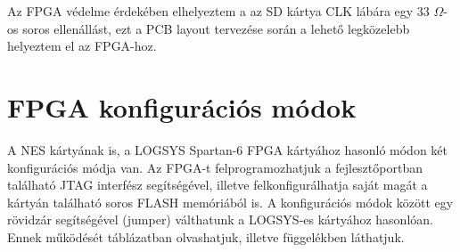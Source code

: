 	Az FPGA védelme érdekében elhelyeztem a az SD kártya CLK lábára egy 33 $\Omega$-os soros ellenállást, ezt a PCB layout tervezése során a lehető legközelebb helyeztem el az FPGA-hoz.  
	
\section{FPGA konfigurációs módok}
	
	A NES kártyának is, a LOGSYS Spartan-6 FPGA kártyához hasonló módon \cite{spatan6} két konfigurációs módja van. Az FPGA-t felprogramozhatjuk a fejlesztőportban található JTAG interfész segítségével, illetve felkonfigurálhatja saját magát a kártyán található soros FLASH memóriából is. A konfigurációs módok között egy rövidzár segítségével (jumper) válthatunk a LOGSYS-es kártyához hasonlóan. Ennek működését  táblázatban olvashatjuk, illetve  függelékben láthatjuk.       
	
